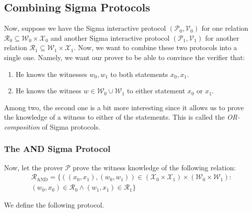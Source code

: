 \documentclass[../lecture-notes-105x135.tex]{subfiles}
\begin{document}
\subsection{Combining Sigma Protocols}

Now, suppose we have the Sigma interactive protocol $(\mathcal{P}_0,\mathcal{V}_0)$ for one relation $\mathcal{R}_0 \subseteq \mathcal{W}_0 \times \mathcal{X}_0$ and another Sigma interactive protocol $(\mathcal{P}_1,\mathcal{V}_1)$ for another relation $\mathcal{R}_1 \subseteq \mathcal{W}_1 \times \mathcal{X}_1$. Now, we want to combine these two protocols into a single one. Namely, we want our prover to be able to convince the verifier that:
\begin{enumerate}
    \item He knows the witnesses $w_0,w_1$ to both statements $x_0,x_1$.
    \item He knows the witness $w \in \mathcal{W}_0 \cup \mathcal{W}_1$ to either statement $x_0$ or $x_1$.
\end{enumerate}

Among two, the second one is a bit more interesting since it allows us to prove the knowledge of a witness to either of the statements. This is called the \textit{OR-composition} of Sigma protocols.

\subsubsection{The AND Sigma Protocol}

Now, let the prover $\mathcal{P}$ prove the witness knowledge of the following relation:
\begin{equation*}
    \begin{aligned}
        &\mathcal{R}_{\text{AND}} = \{ ((x_0,x_1), (w_0,w_1)) \in (\mathcal{X}_0 \times \mathcal{X}_1) \times (\mathcal{W}_0 \times \mathcal{W}_1): \\
        &(w_0,x_0) \in \mathcal{R}_0 \wedge (w_1,x_1) \in \mathcal{R}_1 \}        
    \end{aligned}
\end{equation*}

We define the following protocol.
\end{document}
